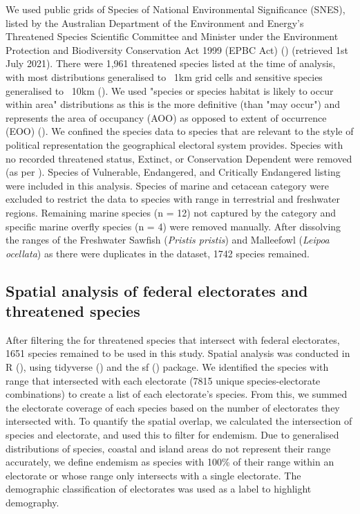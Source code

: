 \documentclass[a4paper,11pt]{article}
\begin{document}
We used public grids of Species of National Environmental Significance (SNES), listed by the Australian Department of the Environment and Energy’s Threatened Species Scientific Committee and Minister under the Environment Protection and Biodiversity Conservation Act 1999 (EPBC Act) (\cite{commonwealthofaustraliaThreatenedSpeciesEPBC2021}) (retrieved 1st July 2021). There were 1,961 threatened species listed at the time of analysis, with most distributions generalised to ~1km grid cells and sensitive species generalised to ~10km (\cite{commonwealthofaustraliaThreatenedSpeciesEPBC2021}). We used "species or species habitat is likely to occur within area" distributions as this is the more definitive (than "may occur") and represents the area of occupancy (AOO) as opposed to extent of occurrence (EOO) (\cite{gastonSizesSpeciesGeographic2009, lloydEstimatingSpatialCoverage2020}). We confined the species data to species that are relevant to the style of political representation the geographical electoral system provides. Species with no recorded threatened status, Extinct, or Conservation Dependent were removed (as per \cite{wardNationalscaleDatasetThreats}). Species of Vulnerable, Endangered, and Critically Endangered listing were included in this analysis. Species of marine and cetacean category were excluded to restrict the data to species with range in terrestrial and freshwater regions. Remaining marine species (n = 12) not captured by the category and specific marine overfly species (n = 4) were removed manually. After dissolving the ranges of the Freshwater Sawfish (\emph{Pristis pristis}) and Malleefowl (\emph{Leipoa ocellata}) as there were duplicates in the dataset, 1742 species remained.

\subsection{Spatial analysis of federal electorates and threatened species}

After filtering the for threatened species that intersect with federal electorates, 1651 species remained to be used in this study. Spatial analysis was conducted in R (\cite{rcoreteamLanguageEnvironmentStatistical2021}), using tidyverse (\cite{wickhamWelcomeTidyverse2019}) and the sf (\cite{pebesmaSimpleFeaturesStandardized2018}) package. We identified the species with range that intersected with each electorate (7815 unique species-electorate combinations) to create a list of each electorate's species. From this, we summed the electorate coverage of each species based on the number of electorates they intersected with. To quantify the spatial overlap, we calculated the intersection of species and electorate, and used this to filter for endemism. Due to generalised distributions of species, coastal and island areas do not represent their range accurately, we define endemism as species with 100\% of their range within an electorate or whose range only intersects with a single electorate. The demographic classification of electorates was used as a label to highlight demography.
\end{document}
